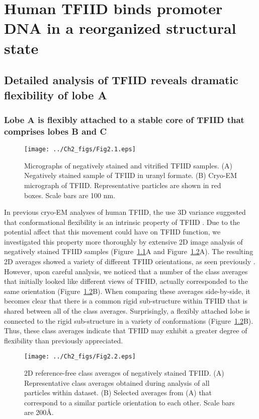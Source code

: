 \chapter{Human TFIID binds promoter DNA in a reorganized structural state}

\section{Detailed analysis of TFIID reveals dramatic flexibility of lobe A}

\subsection{Lobe A is flexibly attached to a stable core of TFIID that comprises lobes B and C} 
\begin{figure}
\centering
\texttt{[image: ../Ch2\_figs/Fig2.1.eps]}
\caption[Micrographs of negatively stained and vitrified TFIID samples]{Micrographs of negatively stained and vitrified TFIID samples. (A) Negatively stained sample of TFIID in uranyl formate.  (B) Cryo-EM micrograph of TFIID.  Representative particles are shown in red boxes.  Scale bars are 100 nm.} 
\label{fig:Fig2.1}
\end{figure}
In previous cryo-EM analyses of human TFIID, the use 3D variance suggested that conformational flexibility is an intrinsic property of TFIID \cite{Grob_1281}. Due to the potential affect that this movement could have on TFIID function, we investigated this property more thoroughly by extensive 2D image analysis of negatively stained TFIID samples (Figure~\ref{fig:Fig2.1}A and Figure~\ref{fig:Fig2.2}A). The resulting 2D averages showed a variety of different TFIID orientations, as seen previously \cite{Grob_1281}. However, upon careful analysis, we noticed that a number of the class averages that initially looked like different views of TFIID, actually corresponded to the same orientation (Figure~\ref{fig:Fig2.2}B). When comparing these averages side-by-side, it becomes clear that there is a common rigid sub-structure within TFIID that is shared between all of the class averages. Surprisingly, a flexibly attached lobe is connected to the rigid sub-structure in a variety of conformations (Figure~\ref{fig:Fig2.2}B). Thus, these class averages indicate that TFIID may exhibit a greater degree of flexibility than previously appreciated.\\
\begin{figure}
\centering
\texttt{[image: ../Ch2\_figs/Fig2.2.eps]}
\caption[2D reference-free class averages of negatively stained TFIID]{2D reference-free class averages of negatively stained TFIID. (A) Representative class averages obtained during analysis of all particles within dataset. (B) Selected averages from (A) that correspond to a similar particle orientation to each other. Scale bars are 200\AA.} 
\label{fig:Fig2.2}
\end{figure}
